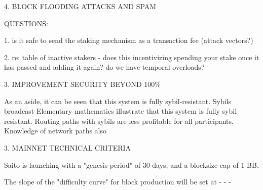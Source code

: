 \documentclass[11.5pt, oneside]{article}   	%
\begin{document}
\begin{multicols}{2}
4. BLOCK FLOODING ATTACKS AND SPAM






QUESTIONS:

1. is it safe to send the staking mechanism as a transaction fee (attack vectors?)

2. re: table of inactive stakers - does this incentivizing spending your stake once it has passed and adding it again? do we have temporal overloads?

3. IMPROVEMENT SECURITY BEYOND 100\%









As an aside, it can be seen that this system is fully sybil-resistant. Sybils broadcast Elementary mathematics illustrate that this system is fully sybil resistant. Routing paths with sybils are less profitable for all participants. Knowledge of network paths also





















3. MAINNET TECHNICAL CRITERIA


Saito is launching with a "genesis period" of 30 days, and a blocksize cap of 1 BB.

The slope of the "difficulty curve" for block production will be set at - - - 


\end{multicols} 
\end{document}
